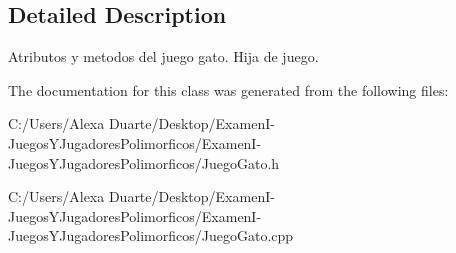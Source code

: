 \subsection{Detailed Description}
Atributos y metodos del juego gato. Hija de juego. 

The documentation for this class was generated from the following files\+:\begin{DoxyCompactItemize}
\item 
C\+:/\+Users/\+Alexa Duarte/\+Desktop/\+Examen\+I-\/\+Juegos\+Y\+Jugadores\+Polimorficos/\+Examen\+I-\/\+Juegos\+Y\+Jugadores\+Polimorficos/Juego\+Gato.\+h\item 
C\+:/\+Users/\+Alexa Duarte/\+Desktop/\+Examen\+I-\/\+Juegos\+Y\+Jugadores\+Polimorficos/\+Examen\+I-\/\+Juegos\+Y\+Jugadores\+Polimorficos/Juego\+Gato.\+cpp\end{DoxyCompactItemize}
